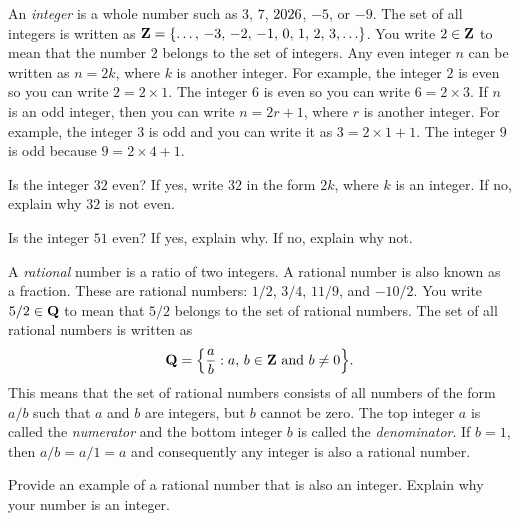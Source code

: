 \documentclass[a4paper,oneside,12pt]{article}
\begin{document}
An \emph{integer} is a whole number such as $3$, $7$, $\the\year$,
$-5$, or $-9$.  The set of all integers is written as
$\ZZ = \set{\dots,\, -3,\, -2,\, -1,\, 0,\, 1,\, 2,\, 3,\dots}$.  You
write $2 \in \mathbf{Z}$ to mean that the number $2$ belongs to the set of
integers.  Any even integer $n$ can be written as $n = 2k$, where $k$
is another integer.  For example, the integer $2$ is even so you can
write $2 = 2 \times 1$.  The integer $6$ is even so you can write
$6 = 2 \times 3$.  If $n$ is an odd integer, then you can write
$n = 2r + 1$, where $r$ is another integer.  For example, the integer
$3$ is odd and you can write it as $3 = 2 \times 1 + 1$.  The integer
$9$ is odd because $9 = 2 \times 4 + 1$.

\begin{exercise}
Is the integer $32$ even?  If yes, write $32$ in the form $2k$, where
$k$ is an integer.  If no, explain why $32$ is not even.
\end{exercise}


\begin{exercise}
Is the integer $51$ even?  If yes, explain why.  If no, explain why
not.
\end{exercise}


A \emph{rational} number is a ratio of two integers.  A
rational number is also known as a fraction.  These are rational
numbers: $1/2$, $3/4$, $11/9$, and $-10/2$.  You write $5/2 \in \mathbf{Q}$
to mean that $5/2$ belongs to the set of rational numbers.  The set of
all rational numbers is written as
\[
\QQ
=
\setdes{
  \frac{a}{b}
}{
  \pair{a}{b} \in \ZZ
  \text{ and }
  b \neq 0
}.
\]
This means that the set of rational numbers consists of all numbers of
the form $a/b$ such that $a$ and $b$ are integers, but $b$ cannot be
zero.  The top integer $a$ is called the \emph{numerator} and the
bottom integer $b$ is called the \emph{denominator}.  If $b = 1$, then
$a/b = a/1 = a$ and consequently any integer is also a rational
number.

\begin{exercise}
Provide an example of a rational number that is also an integer.
Explain why your number is an integer.
\end{exercise}
\end{document}
